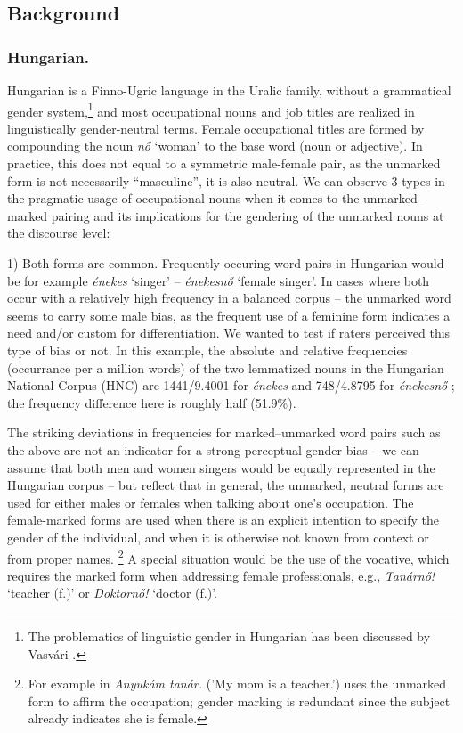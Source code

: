 \documentclass[runningheads]{llncs}
\begin{document}
\subsection{Background}

\subsubsection{Hungarian.}

Hungarian is a Finno-Ugric language in the Uralic family, without a grammatical gender system,\footnote{The problematics of linguistic gender in Hungarian has been discussed by Vasvári \citep{vasvari_2014_problemas}.} and most occupational nouns and job titles are realized in linguistically gender-neutral terms. Female occupational titles are formed by compounding the noun \textit{nő} `woman' to the base word (noun or adjective). In practice, this does not equal to a symmetric male-female pair, as the unmarked form is not necessarily ``masculine'', it is also neutral. We can observe 3 types in the pragmatic usage of occupational nouns when it comes to the unmarked--marked pairing and its implications for the gendering of the unmarked nouns at the discourse level:

1) Both forms are common. Frequently occuring word-pairs in Hungarian would be for example \textit{énekes} `singer' -- \textit{énekesnő} `female singer'. In cases where both occur with a relatively high frequency in a balanced corpus -- the unmarked word seems to carry some male bias, as the frequent use of a feminine form indicates a need and/or custom for differentiation. We wanted to test if raters perceived this type of bias or not. In this example, the absolute and relative frequencies (occurrance per a million words) of the two lemmatized nouns in the Hungarian National Corpus (HNC) are 1441/9.4001 for \textit{énekes} and 748/4.8795 for \textit{énekesnő} \citep{varadi_2002_hungarian, oravecz_2014_hungarian}; the frequency difference here is roughly half (51.9\%).

The striking deviations in frequencies for marked--unmarked word pairs such as the above are not an indicator for a strong perceptual gender bias -- we can assume that both men and women singers would be equally represented in the Hungarian corpus -- but reflect that in general, the unmarked, neutral forms are used for either males or females when talking about one's occupation. The female-marked forms are used when there is an explicit intention to specify the gender of the individual, and when it is otherwise not known from context or from proper names.
\footnote{For example in \textit{Anyukám tanár.} ('My mom is a teacher.') uses the unmarked form to affirm the occupation; gender marking is redundant since the subject already indicates she is female.}
A special situation would be the use of the vocative, which requires the marked form when addressing female professionals, e.g., \textit{Tanárnő!} `teacher (f.)' or \textit{Doktornő!} `doctor (f.)'.
\end{document}
